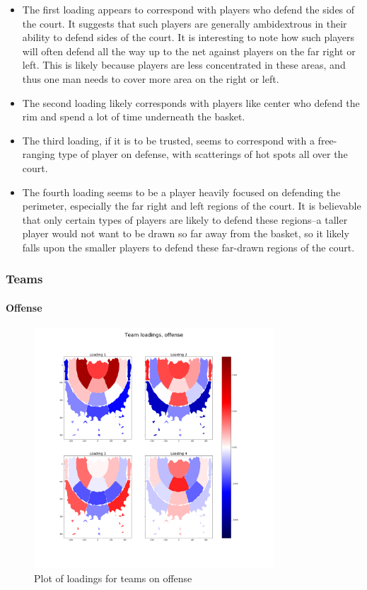 \documentclass[]{article}
\let\oldparagraph\paragraph
\renewcommand{\paragraph}[1]{\oldparagraph{#1}\mbox{}}
\begin{document}
\begin{itemize}
\item
  The first loading appears to correspond with players who defend the
  sides of the court. It suggests that such players are generally
  ambidextrous in their ability to defend sides of the court. It is
  interesting to note how such players will often defend all the way up
  to the net against players on the far right or left. This is likely
  because players are less concentrated in these areas, and thus one man
  needs to cover more area on the right or left.
\item
  The second loading likely corresponds with players like center who
  defend the rim and spend a lot of time underneath the basket.
\item
  The third loading, if it is to be trusted, seems to correspond with a
  free-ranging type of player on defense, with scatterings of hot spots
  all over the court.
\item
  The fourth loading seems to be a player heavily focused on defending
  the perimeter, especially the far right and left regions of the court.
  It is believable that only certain types of players are likely to
  defend these regions--a taller player would not want to be drawn so
  far away from the basket, so it likely falls upon the smaller players
  to defend these far-drawn regions of the court.
\end{itemize}

\subsubsection{Teams}\label{teams}

\paragraph{Offense}\label{offense-1}

\begin{figure}
\centering
\includegraphics[width=0.80000\textwidth]{first_4_loadings_teams_off.png}
\caption{Plot of loadings for teams on offense}
\end{figure}
\end{document}

